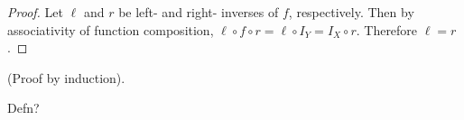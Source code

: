 \begin{proof}
    Let $\ell$ and $r$ be left- and right- inverses of $f$, respectively. Then by associativity of function composition, $\ell \circ f \circ r = \ell \circ I_Y = I_X \circ r$. Therefore $\ell = r$.
\end{proof}

\begin{defn}
    (Proof by induction).
    
    Defn?
\end{defn}
